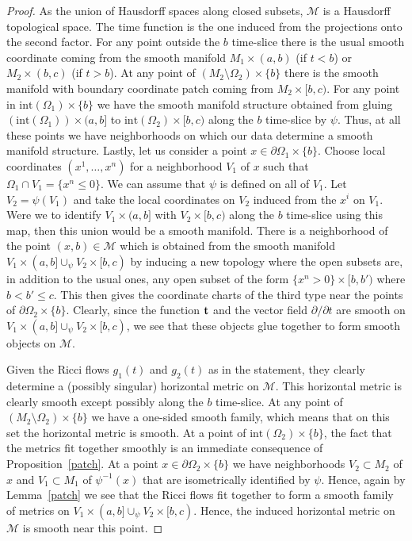 \begin{proof}
As the union of Hausdorff spaces along closed subsets, ${\mathcal
M}$ is a Hausdorff topological space. The time function is the one
induced from the projections onto the second factor. For any point
outside the $b$ time-slice there is the usual smooth coordinate
coming from the smooth manifold $M_1\times (a,b)$ (if $t<b$) or
$M_2\times (b,c)$ (if $t>b$). At any point of
$(M_2\setminus\Omega_2)\times \{b\}$ there is the smooth manifold
with boundary coordinate patch coming from $M_2\times[b,c)$. For any
point in $\mathrm{int}(\Omega_1)\times\{b\}$ we have the smooth
manifold structure obtained from gluing $(\mathrm{int}(\Omega_1))\times
(a,b]$ to $\mathrm{int}(\Omega_2)\times [b,c)$ along the $b$ time-slice
by $\psi$. Thus, at all these points we have neighborhoods on which
our data determine a smooth manifold structure. Lastly, let us
consider a point $x\in
\partial \Omega_1\times \{b\}$.
Choose local coordinates $(x^1,\ldots,x^n)$ for a neighborhood $V_1$
of $x$ such that $\Omega_1\cap V_1=\{x^n\le 0\}$. We can assume that
$\psi$ is defined on all of $V_1$. Let $V_2=\psi(V_1)$ and take the
 local coordinates on $V_2$ induced from the $x^i$ on $V_1$.
 Were we to identify $V_1\times (a,b]$
with $V_2\times [b,c)$ along the $b$ time-slice using this map, then
this union would be a smooth manifold.  There is a
neighborhood of the point $(x,b)\in {\mathcal M}$ which is obtained
from the smooth manifold $V_1\times (a,b]\cup_\psi V_2\times [b,c)$
by inducing a new topology where the open subsets are, in addition
to the usual ones, any open subset of the form $\{x^n>0\}\times
[b,b')$ where $b<b'\le c$. This then gives the coordinate charts of
the third type near the points of $\partial \Omega_2\times \{b\}$.
Clearly, since the function ${\bf t}$ and the vector field
$\partial/\partial t$ are smooth on $V_1\times (a,b]\cup_\psi
V_2\times [b,c)$, we see that these objects glue together to form
smooth objects on ${\mathcal M}$.



Given the Ricci flows $g_1(t)$ and $g_2(t)$ as in the statement,
they clearly determine a (possibly singular) horizontal metric on
${\mathcal M}$. This horizontal metric is clearly smooth except
possibly along the $b$ time-slice. At any point of
$(M_2\setminus\Omega_2)\times\{b\}$ we have a one-sided smooth
family, which means that on this set the horizontal metric is
smooth. At a point of $\mathrm{int}(\Omega_2)\times \{b\}$, the fact
that the metrics fit together smoothly is an immediate consequence
of Proposition~\ref{patch}. At a point $x\in
\partial \Omega_2\times \{b\}$ we have neighborhoods $V_2\subset M_2$
of $x$ and $V_1\subset M_1$ of $\psi^{-1}(x)$ that are isometrically
identified by $\psi$. Hence, again by Lemma~\ref{patch} we see that
the Ricci flows fit together to form a smooth family of metrics on
$V_1\times (a,b]\cup_\psi V_2\times [b,c)$. Hence, the induced
horizontal metric on ${\mathcal M}$ is smooth near this point.
\end{proof}

